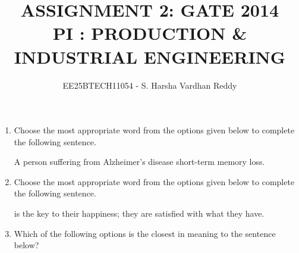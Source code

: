 \documentclass[journal,12pt,onecolumn]{IEEEtran}
\theoremstyle{remark}
\begin{document}
\title{
ASSIGNMENT 2: GATE 2014  \\
PI : PRODUCTION \& INDUSTRIAL ENGINEERING}
\author{EE25BTECH11054 - S. Harsha Vardhan Reddy}
\maketitle
\renewcommand{\thefigure}{\theenumi}
\renewcommand{\thetable}{\theenumi}
\begin{enumerate}
    \item Choose the most appropriate word from the options given below to complete the following sentence.
    
    A person suffering from Alzheimer's disease \underline{\hspace{2cm}} short-term memory loss.
    
    \hfill{}
    \begin{enumerate}
    \end{enumerate}

    \item Choose the most appropriate word from the options given below to complete the following sentence.
    
    \underline{\hspace{2cm}} is the key to their happiness; they are satisfied with what they have.
    
    \hfill{}
    \begin{enumerate}
    \end{enumerate}

    \item Which of the following options is the closest in meaning to the sentence below?
    

\end{enumerate}
\end{document}
